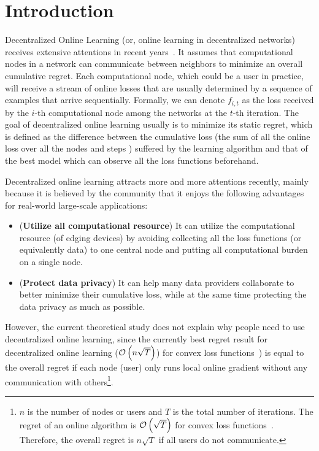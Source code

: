 \documentclass{article}
\begin{document}
\section{Introduction}
\label{sect_introduction}
Decentralized Online Learning (or, online learning in decentralized networks) receives extensive attentions in recent years~\citep{8015179Shahram,Kamp:2014:CDO,Koppel-8352032,Zhang2018,pmlr-v70-zhang17g,Xu2015,tcns-7353155,cdc-7798923,acc-7172037,tcns-7479495,Benczur:2018ww,tkde-6311406}. 
It assumes that computational nodes in a network can communicate between neighbors to minimize an overall cumulative regret.
Each computational node, which could be a user in practice, will receive a stream of online losses that are usually determined by a sequence of examples that arrive sequentially. 
Formally, we can denote $f_{i,t}$  as the loss received by the $i$-th computational node among the networks at the $t$-th iteration. 
The goal of decentralized online learning usually is to minimize its static regret, which is defined as the difference between the cumulative loss (the sum of all the online loss over all the nodes and steps ) suffered by the learning algorithm and that of the best model which can observe all the loss functions beforehand. 

Decentralized online learning attracts more and more attentions recently, mainly because it is believed by the community that it enjoys the following advantages for real-world large-scale applications:
\begin{itemize}
\item ({\bf Utilize all computational resource}) It can utilize the computational resource (of edging devices) by avoiding collecting all the loss functions (or equivalently data) to one central node and putting all computational burden on a single node. %
\item ({\bf Protect data privacy}) It can help many data providers collaborate to better minimize their cumulative loss, while at the same time protecting the data privacy as much as possible. 
\end{itemize}
However, the current theoretical study does not explain why people need to use decentralized online learning, since the currently best regret result for decentralized online learning (${\mathcal{O}\left( n\sqrt{T} \right)}$) for convex loss functions~\citep{6760092,tkde-6311406}) is equal to the overall regret if each node (user) only runs local online gradient without any communication with others\footnote{$n$ is the number of nodes or users and $T$ is the total number of iterations. The regret of an online algorithm is ${\mathcal{O}\left( \sqrt{T} \right)}$ for convex loss functions~\citep{Hazan2016Introduction,ShalevShwartz:2012dz}. Therefore, the overall regret is $n\sqrt{T}$ if all users do not communicate.}. 
\end{document}

